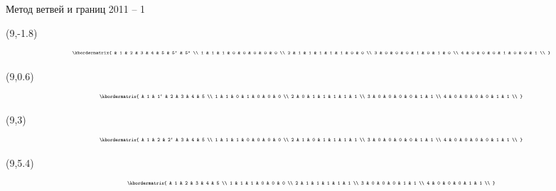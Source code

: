 \documentclass[10pt, dvipsnames]{beamer}
\begin{document}
\begin{frame}{Метод ветвей и границ 2011 -- 1}
	\begin{textblock}{1}(9,-1.8)
\[
\tiny
  \kbordermatrix{
      & 1 & 2 & 3 & 4 & 5 & 5` & 5`` \\
    1 & 1 & 1 & 0 & 0 & 0 & 0  & 0   \\
    2 & 1 & 1 & 1 & 1 & 1 & 0  & 0   \\
    3 & 0 & 0 & 0 & 1 & 0 & 1  & 0   \\
    4 & 0 & 0 & 0 & 1 & 0 & 0  & 1   \\
  }
\]
	\end{textblock}

	\begin{textblock}{1}(9,0.6)
\[
\tiny
  \kbordermatrix{
      & 1 & 1` & 2 & 3 & 4 & 5 \\
    1 & 1 & 0  & 1 & 0 & 0 & 0 \\
    2 & 0 & 1  & 1 & 1 & 1 & 1 \\
    3 & 0 & 0  & 0 & 0 & 1 & 1 \\
    4 & 0 & 0  & 0 & 0 & 1 & 1 \\
  }
\]
	\end{textblock}

	\begin{textblock}{1}(9,3)
	\[
\tiny
  \kbordermatrix{
      & 1 & 2 & 2` & 3 & 4 & 5 \\
    1 & 1 & 1 & 0  & 0 & 0 & 0 \\
    2 & 1 & 0 & 1  & 1 & 1 & 1 \\
    3 & 0 & 0 & 0  & 0 & 1 & 1 \\
    4 & 0 & 0 & 0  & 0 & 1 & 1 \\
  }
\]
	\end{textblock}

	\begin{textblock}{1}(9,5.4)
	\[
\tiny
  \kbordermatrix{
      & 1 & 2 & 3 & 4 & 5 \\
    1 & 1 & 1 & 0 & 0 & 0 \\
    2 & 1 & 1 & 1 & 1 & 1 \\
    3 & 0 & 0 & 0 & 1 & 1 \\
    4 & 0 & 0 & 0 & 1 & 1 \\
  }
\]
	\end{textblock}

\end{frame}
\end{document}
